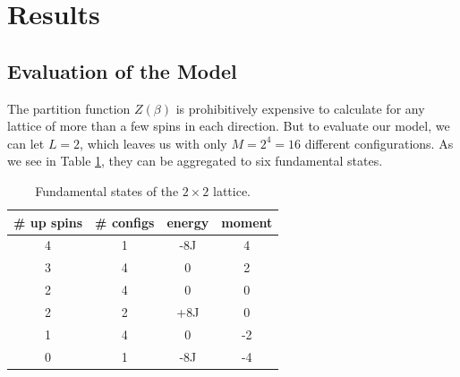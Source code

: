 \documentclass[]{article}
\begin{document}





\clearpage
\section{Results} \label{sec:results}


\subsection{Evaluation of the Model} \label{sec:eval-model}

The partition function $Z(\beta)$ is prohibitively expensive to calculate for any lattice of more than a few spins in each direction. But to evaluate our model, we can let $L=2$, which leaves us with only $M = 2^4 = 16$ different configurations. As we see in Table \ref{tab:2x2-states}, they can be aggregated to six fundamental states.

\begin{table}[!h]
	\caption{Fundamental states of the $2 \times 2$ lattice.}
	\label{tab:2x2-states}
	\begin{center}
		\begin{tabular}{c|c|c|c}
			\toprule
			\# up spins 		& \# configs		& energy	& moment	\\
			\midrule
			4				& 1				& -8J		& 4			\\
			3				& 4				&  0		& 2			\\
			2				& 4				&  0		& 0			\\
			2				& 2				& +8J		& 0			\\
			1				& 4				&  0		& -2		\\
			0				& 1				& -8J		& -4		\\
			\bottomrule
		\end{tabular}
	\end{center}
\end{table}
\end{document}
